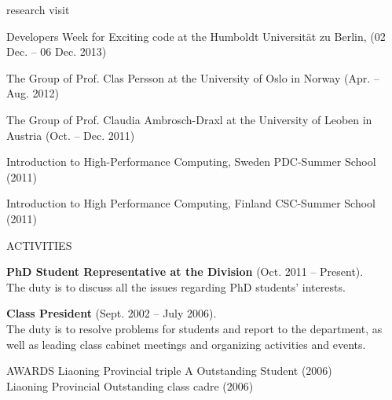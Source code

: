 \documentclass{resume} %
\begin{document}

\begin{rSection}{research visit}
 
Developers Week for Exciting code at the Humboldt Universität zu Berlin, (02 Dec. -- 06 Dec. 2013) 

The Group of  Prof. Clas Persson at the University of Oslo in Norway (Apr. -- Aug. 2012)

The Group of Prof. Claudia Ambrosch-Draxl at the University of Leoben in Austria (Oct. -- Dec. 2011)

Introduction to High-Performance Computing, Sweden PDC-Summer School (2011) 

Introduction to High Performance Computing, Finland CSC-Summer School (2011)
 
\end{rSection}


\begin{rSection}{ACTIVITIES}


{\bf PhD Student Representative at the Division} (Oct. 2011 -- Present).\\
The duty is to discuss all the issues regarding PhD students' interests.


{\bf Class President} (Sept. 2002 -- July 2006).\\
The duty is to resolve problems for students and report to the department, as well as leading class cabinet meetings and organizing activities and events.
                            
\end{rSection}

\begin{rSection}{AWARDS}
Liaoning Provincial triple A Outstanding Student (2006)\\
Liaoning Provincial Outstanding class cadre (2006)
\end{rSection}






\newpage
\end{document}
